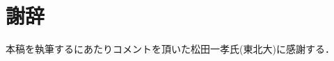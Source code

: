 \documentclass[T]{compsoft}
\begin{document}
%
\section*{謝辞}
本稿を執筆するにあたりコメントを頂いた松田一孝氏(東北大)に感謝する．



\end{document}
